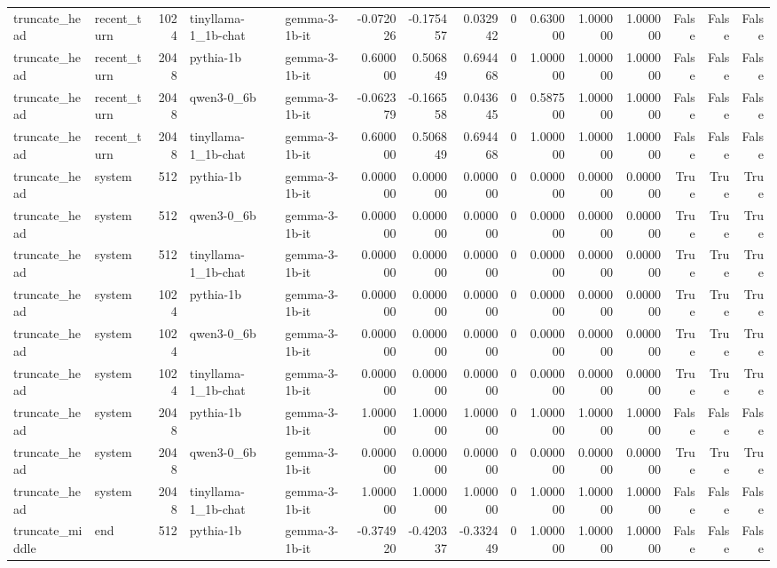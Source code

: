 \begin{tabular}{llrllrrrrrrrrrr}
truncate_head & recent_turn & 1024 & tinyllama-1_1b-chat & gemma-3-1b-it & -0.072026 & -0.175457 & 0.032942 & 0 & 0.630000 & 1.000000 & 1.000000 & False & False & False \\
truncate_head & recent_turn & 2048 & pythia-1b & gemma-3-1b-it & 0.600000 & 0.506849 & 0.694468 & 0 & 1.000000 & 1.000000 & 1.000000 & False & False & False \\
truncate_head & recent_turn & 2048 & qwen3-0_6b & gemma-3-1b-it & -0.062379 & -0.166558 & 0.043645 & 0 & 0.587500 & 1.000000 & 1.000000 & False & False & False \\
truncate_head & recent_turn & 2048 & tinyllama-1_1b-chat & gemma-3-1b-it & 0.600000 & 0.506849 & 0.694468 & 0 & 1.000000 & 1.000000 & 1.000000 & False & False & False \\
truncate_head & system & 512 & pythia-1b & gemma-3-1b-it & 0.000000 & 0.000000 & 0.000000 & 0 & 0.000000 & 0.000000 & 0.000000 & True & True & True \\
truncate_head & system & 512 & qwen3-0_6b & gemma-3-1b-it & 0.000000 & 0.000000 & 0.000000 & 0 & 0.000000 & 0.000000 & 0.000000 & True & True & True \\
truncate_head & system & 512 & tinyllama-1_1b-chat & gemma-3-1b-it & 0.000000 & 0.000000 & 0.000000 & 0 & 0.000000 & 0.000000 & 0.000000 & True & True & True \\
truncate_head & system & 1024 & pythia-1b & gemma-3-1b-it & 0.000000 & 0.000000 & 0.000000 & 0 & 0.000000 & 0.000000 & 0.000000 & True & True & True \\
truncate_head & system & 1024 & qwen3-0_6b & gemma-3-1b-it & 0.000000 & 0.000000 & 0.000000 & 0 & 0.000000 & 0.000000 & 0.000000 & True & True & True \\
truncate_head & system & 1024 & tinyllama-1_1b-chat & gemma-3-1b-it & 0.000000 & 0.000000 & 0.000000 & 0 & 0.000000 & 0.000000 & 0.000000 & True & True & True \\
truncate_head & system & 2048 & pythia-1b & gemma-3-1b-it & 1.000000 & 1.000000 & 1.000000 & 0 & 1.000000 & 1.000000 & 1.000000 & False & False & False \\
truncate_head & system & 2048 & qwen3-0_6b & gemma-3-1b-it & 0.000000 & 0.000000 & 0.000000 & 0 & 0.000000 & 0.000000 & 0.000000 & True & True & True \\
truncate_head & system & 2048 & tinyllama-1_1b-chat & gemma-3-1b-it & 1.000000 & 1.000000 & 1.000000 & 0 & 1.000000 & 1.000000 & 1.000000 & False & False & False \\
truncate_middle & end & 512 & pythia-1b & gemma-3-1b-it & -0.374920 & -0.420337 & -0.332449 & 0 & 1.000000 & 1.000000 & 1.000000 & False & False & False \\

\end{tabular}
